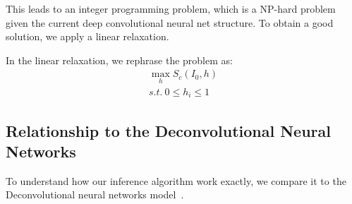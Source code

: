 This leads to an integer programming problem, which is a NP-hard problem given the current deep convolutional neural net structure. To obtain a good solution, we apply a linear relaxation.

In the linear relaxation, we rephrase the problem as:
\begin{equation}
\begin{aligned}
  \max_h S_c(I_0, h) \\
  s.t.\ 0 \leq h_i \leq 1
\end{aligned}
\end{equation}

\subsection{Relationship to the Deconvolutional Neural Networks}


To understand how our inference algorithm work exactly, we compare it to the Deconvolutional neural networks model~\cite{}.


